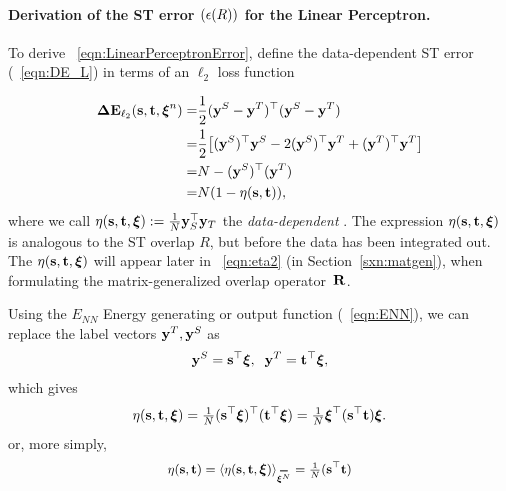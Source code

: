 \paragraph{Derivation of the  ST error $(\epsilon(R))$ for the Linear Perceptron.}
To derive \EQN~\ref{eqn:LinearPerceptronError},
define the data-dependent ST error (\EQN~\ref{eqn:DE_L}) in terms of an $\ell_2$ loss function

\begin{align}
\nonumber
\mathbf{\Delta {E}}_{\ell_2}({\mathbf{s}},{\mathbf{t}}, \boldsymbol{\xi}^{n})= & \frac{1}{2} (\mathbf{y}^{S} - \mathbf{y}^{T})^{\top} (\mathbf{y}^{S} - \mathbf{y}^{T}) \\
\nonumber
=& \frac{1}{2} \big[(\mathbf{y}^{S})^{\top} \mathbf{y}^{S} - 2 (\mathbf{y}^{S})^{\top} \mathbf{y}^{T} + (\mathbf{y}^{T})^{\top} \mathbf{y}^{T} \big] \\
\nonumber
=& N - (\mathbf{y}^{S})^{\top} (\mathbf{y}^{T}) \\
\label{eqn:deriveSTerror}
=& N(1 - \eta({\mathbf{s}},{\mathbf{t}})),
\end{align}
where we call $\eta({\mathbf{s}},{\mathbf{t}},\boldsymbol{\xi}):=\tfrac{1}{N}\mathbf{y}_{S}^{\top}\mathbf{y}_{T}$
the \emph{data-dependent \SelfOverlap}.
The expression $\eta({\mathbf{s}},{\mathbf{t}},\boldsymbol{\xi})$ is analogous to the ST overlap $R$, but before the data has been integrated out.
The \SelfOverlap $\eta({\mathbf{s}},{\mathbf{t}},\boldsymbol{\xi})$ will appear later in \EQN~\ref{eqn:eta2} (in Section~\ref{sxn:matgen}), 
when formulating the matrix-generalized overlap operator~$\mathbf{R}$.

Using the $E_{NN}$ Energy generating or output function (\EQN~\ref{eqn:ENN}), we can replace the label vectors $\mathbf{y}^{T},\mathbf{y}^{S}$ as
\begin{align}
\mathbf{y}^{S}={\mathbf{s}}^{\top}\boldsymbol{\xi},\;\;
\mathbf{y}^{T}={\mathbf{t}}^{\top}\boldsymbol{\xi}  ,
\end{align}
which gives
\begin{align}
  \label{eqn:eta_vec_xi_def}
\eta({\mathbf{s}},{\mathbf{t}},\boldsymbol{\xi}) = \tfrac{1}{N}({\mathbf{s}}^{\top}\boldsymbol{\xi})^{\top} ({\mathbf{t}}^{\top}\boldsymbol{\xi}) = \tfrac{1}{N}\boldsymbol{\xi}^{\top} ({\mathbf{s}}^{\top} {\mathbf{t}} )\boldsymbol{\xi}   .
\end{align}
or, more simply,
\begin{align}
  \label{eqn:eta_vec_avg_def}
\ETA(\SVEC,\TVEC) = \langle\ETA(\SVEC,\TVEC,\XI)\rangle_{\AVGNDXI}=\tfrac{1}{N}(\SVEC^{\top} \TVEC )
\end{align}

